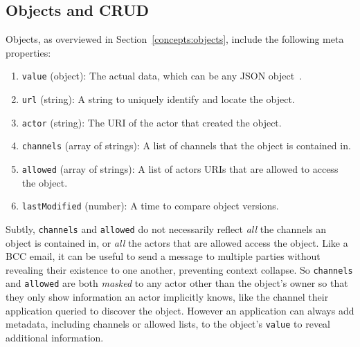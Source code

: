 
\subsection{Objects and CRUD}

Objects, as overviewed in Section~\ref{concepts:objects}, include
the following meta properties:
\begin{enumerate}
\item
\texttt{value} (object): The actual data, which can be any JSON object~\cite{json}.
\item
\texttt{url} (string): A string to uniquely identify and locate the object.
\item
\texttt{actor} (string): The URI of the actor that created the object.
\item
\texttt{channels} (array of strings): A list of channels that the object is contained in.
\item
\texttt{allowed} (array of strings): A list of actors URIs that are allowed to access the object.
\item
\texttt{lastModified} (number): A time to compare object versions.
\end{enumerate}

Subtly, \texttt{channels} and \texttt{allowed} do not necessarily
reflect \emph{all} the channels an object is contained in, or
\emph{all} the actors that are allowed access the object.
Like a BCC email, it can be useful to send a message to multiple parties
without revealing their existence to one another, preventing
context collapse.
So \texttt{channels} and \texttt{allowed} are both \emph{masked} to any
actor other than the object's owner so that they only show information an actor implicitly knows,
like the channel their application queried to discover the object.
However an application can always
add metadata, including channels or allowed lists, to the object's \texttt{value}
to reveal additional information.


